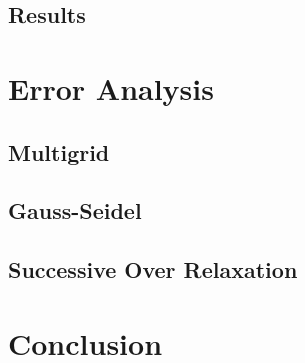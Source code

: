 \documentclass[pdftex,12pt,a4paper]{article}
\begin{document}
    \subsection{Results}
        \paragraph*{}

\section{Error Analysis}
    
    \subsection{Multigrid}   
        \paragraph*{}

    \subsection{Gauss-Seidel}
        \paragraph*{}

    \subsection{Successive Over Relaxation}
        \paragraph*{}

\section{Conclusion}















\end{document}

